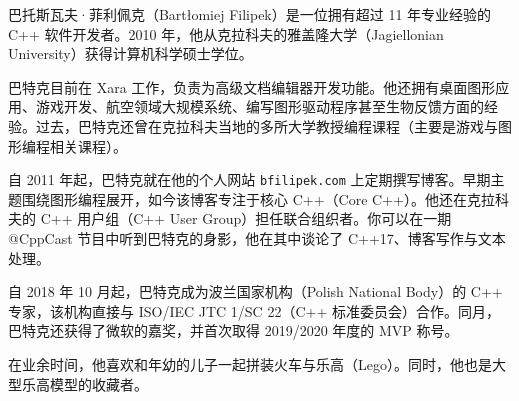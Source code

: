 巴托斯瓦夫·菲利佩克（Bartłomiej Filipek）是一位拥有超过 11 年专业经验的 C++ 软件开发者。2010 年，他从克拉科夫的雅盖隆大学（Jagiellonian University）获得计算机科学硕士学位。

巴特克目前在 Xara 工作，负责为高级文档编辑器开发功能。他还拥有桌面图形应用、游戏开发、航空领域大规模系统、编写图形驱动程序甚至生物反馈方面的经验。过去，巴特克还曾在克拉科夫当地的多所大学教授编程课程（主要是游戏与图形编程相关课程）。

自 2011 年起，巴特克就在他的个人网站 \texttt{bfilipek.com} 上定期撰写博客。早期主题围绕图形编程展开，如今该博客专注于核心 C++（Core C++）。他还在克拉科夫的 C++ 用户组（C++ User Group）担任联合组织者。你可以在一期 @CppCast 节目中听到巴特克的身影，他在其中谈论了 C++17、博客写作与文本处理。

自 2018 年 10 月起，巴特克成为波兰国家机构（Polish National Body）的 C++ 专家，该机构直接与 ISO/IEC JTC 1/SC 22（C++ 标准委员会）合作。同月，巴特克还获得了微软的嘉奖，并首次取得 2019/2020 年度的 MVP 称号。

在业余时间，他喜欢和年幼的儿子一起拼装火车与乐高（Lego）。同时，他也是大型乐高模型的收藏者。